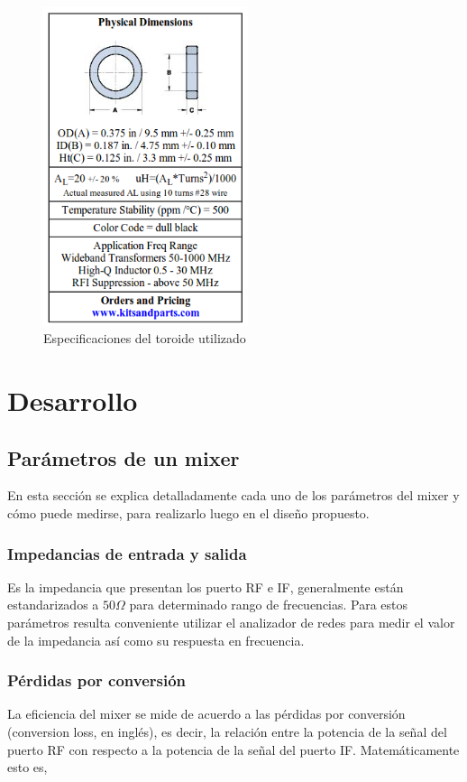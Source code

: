 \documentclass[a4paper,10pt]{article}
\begin{document}
	\begin{figure}[!htb]
		\centering
		\includegraphics[width=6cm]{Images/specToroid.png}
		\caption{Especificaciones del toroide utilizado}
		\label{chupalaDalmati}
	\end{figure}

\newpage
\section{Desarrollo}
	\subsection{Parámetros de un mixer}
	\indent En esta secci\'on se explica detalladamente cada uno de los 
	par\'ametros del mixer y c\'omo puede medirse, para realizarlo luego en el 
	dise\~no propuesto.
	
	\subsubsection{Impedancias de entrada y salida}
	\indent Es la impedancia que presentan los puerto RF e IF, generalmente 
	est\'an estandarizados a $50\Omega$ para determinado rango de frecuencias. 
	Para estos par\'ametros resulta conveniente utilizar el analizador de redes 
	para medir el valor de la impedancia as\'i como su respuesta en frecuencia.
	
	\subsubsection{P\'erdidas por conversi\'on}
	\indent La eficiencia del mixer se mide de acuerdo a las p\'erdidas por 
	conversi\'on (conversion loss, en ingl\'es), es decir, la relación entre la 
	potencia de la señal del puerto RF con respecto a la potencia de la señal 
	del puerto IF. Matem\'aticamente esto es,
		
\end{document}
